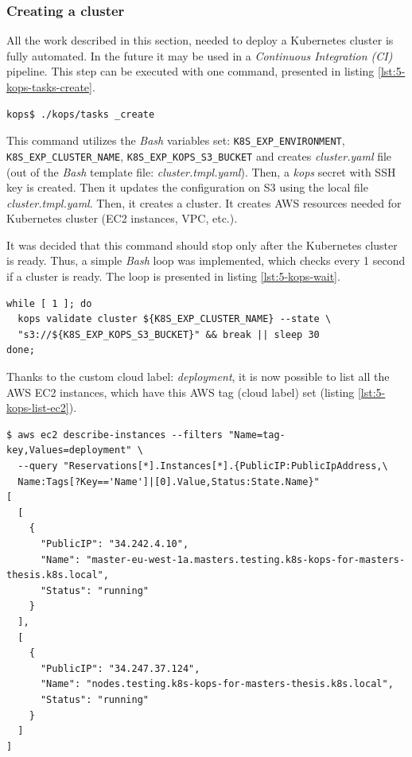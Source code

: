 \subsubsection{Creating a cluster}
\label{kops-creating-the-cluster}
All the work described in this section, needed to deploy a Kubernetes cluster is fully automated. In the future it may be used in a \textit{Continuous Integration (CI)} pipeline. This step can be executed with one command, presented in listing \ref{lst:5-kops-tasks-create}.
\begin{lstlisting}[basicstyle=\scriptsize,xleftmargin=0cm,label=lst:5-kops-tasks-create,caption={\textit{Bash} command automating cluster creation}]
kops$ ./kops/tasks _create
\end{lstlisting}

This command utilizes the \textit{Bash} variables set: \verb|K8S_EXP_ENVIRONMENT|, \\
\verb|K8S_EXP_CLUSTER_NAME|, \verb|K8S_EXP_KOPS_S3_BUCKET| and creates \textit{cluster.yaml} file (out of the \textit{Bash} template file: \textit{cluster.tmpl.yaml}). Then, a \textit{kops} secret with SSH key is created. Then it updates the configuration on S3 using the local file \textit{cluster.tmpl.yaml}. Then, it creates a cluster. It creates AWS resources needed for Kubernetes cluster (EC2 instances, VPC, etc.).

It was decided that this command should stop only after the Kubernetes cluster is ready. Thus, a simple \textit{Bash} loop was implemented, which checks every 1 second if a cluster is ready. The loop is presented in listing \ref{lst:5-kops-wait}.
\begin{lstlisting}[basicstyle=\scriptsize,xleftmargin=0cm,label=lst:5-kops-wait,caption={A waiting mechanism that waits until a \textit{kops} cluster is ready}]
while [ 1 ]; do
  kops validate cluster ${K8S_EXP_CLUSTER_NAME} --state \
  "s3://${K8S_EXP_KOPS_S3_BUCKET}" && break || sleep 30
done;
\end{lstlisting}



Thanks to the custom cloud label: \textit{deployment}, it is now possible to list all the AWS EC2 instances, which have this AWS tag (cloud label) set (listing \ref{lst:5-kops-list-ec2}).
\begin{lstlisting}[basicstyle=\scriptsize,xleftmargin=0cm,label=lst:5-kops-list-ec2,caption={Listing all AWS EC2 instances by AWS tag}]
$ aws ec2 describe-instances --filters "Name=tag-key,Values=deployment" \
  --query "Reservations[*].Instances[*].{PublicIP:PublicIpAddress,\
  Name:Tags[?Key=='Name']|[0].Value,Status:State.Name}"
[
  [
    {
      "PublicIP": "34.242.4.10",
      "Name": "master-eu-west-1a.masters.testing.k8s-kops-for-masters-thesis.k8s.local",
      "Status": "running"
    }
  ],
  [
    {
      "PublicIP": "34.247.37.124",
      "Name": "nodes.testing.k8s-kops-for-masters-thesis.k8s.local",
      "Status": "running"
    }
  ]
]
\end{lstlisting}


